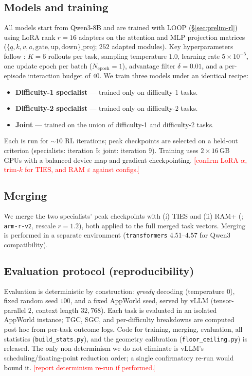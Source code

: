 \documentclass[11pt]{article}
\newcommand{\TODO}[1]{\textcolor{red}{[#1]}} %
\begin{document}
\subsection{Models and training}
\label{sec:setup-train}
All models start from Qwen3-8B and are trained with LOOP (\S\ref{sec:prelim-rl}) using
LoRA rank $r{=}16$ adapters on the attention and MLP projection matrices
($\{q,k,v,o,\text{gate},\text{up},\text{down}\}\_\text{proj}$; $252$ adapted modules).
Key hyperparameters follow \citet{loop2025}: $K{=}6$ rollouts per task, sampling
temperature $1.0$, learning rate $5\times10^{-5}$, one update epoch per batch
($N_{\text{epoch}}{=}1$), advantage filter $\delta{=}0.01$, and a per-episode interaction
budget of $40$. We train three models under an identical recipe:
\begin{itemize}
\item \textbf{Difficulty-1 specialist} --- trained only on difficulty-1 tasks.
\item \textbf{Difficulty-2 specialist} --- trained only on difficulty-2 tasks.
\item \textbf{Joint} --- trained on the union of difficulty-1 and difficulty-2 tasks.
\end{itemize}
Each is run for $\sim\!10$ RL iterations; peak checkpoints are selected on a held-out
criterion (specialists: iteration $5$; joint: iteration $9$). Training uses $2\times16$\,GB
GPUs with a balanced device map and gradient checkpointing.
\TODO{confirm LoRA $\alpha$, trim-$k$ for TIES, and RAM $\varepsilon$ against configs.}

\subsection{Merging}
\label{sec:setup-merge}
We merge the two specialists' peak checkpoints with (i) TIES \citep{yadav2023ties} and
(ii) RAM+ (\citealp{ram2026}; \texttt{arm-r-v2}, rescale $r{=}1.2$), both applied to the
full merged task vectors. Merging is performed in a separate environment
(\texttt{transformers} 4.51--4.57 for Qwen3 compatibility).

\subsection{Evaluation protocol (reproducibility)}
\label{sec:setup-eval}
Evaluation is deterministic by construction: \emph{greedy} decoding (temperature $0$),
fixed random seed $100$, and a fixed AppWorld seed, served by vLLM (tensor-parallel $2$,
context length $32{,}768$). Each task is evaluated in an isolated AppWorld instance; TGC,
SGC, and per-difficulty breakdowns are computed post hoc from per-task outcome logs. Code
for training, merging, evaluation, all statistics
(\texttt{build\_stats.py}), and the geometry calibration
(\texttt{floor\_ceiling.py}) is released. The only non-determinism we do not eliminate is
vLLM's scheduling/floating-point reduction order; a single confirmatory re-run would
bound it. \TODO{report determinism re-run if performed.}
\end{document}
